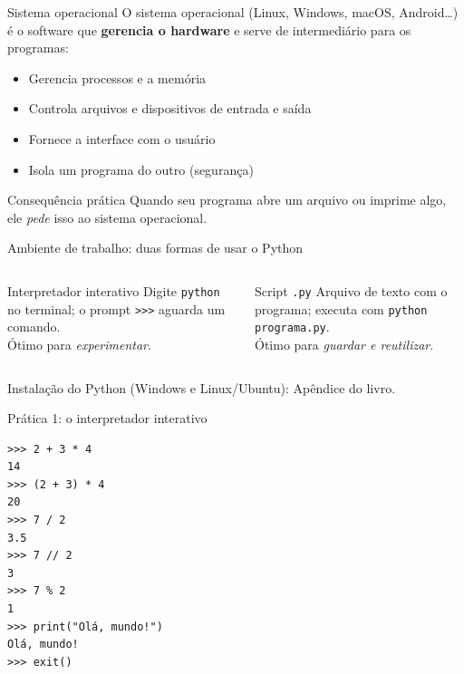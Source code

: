 \documentclass[aspectratio=169,10pt,t]{beamer}
\begin{document}
\begin{frame}{Sistema operacional}
  O sistema operacional (Linux, Windows, macOS, Android\ldots) é o software que \textbf{gerencia o hardware} e serve de intermediário para os programas:
  \begin{itemize}
    \item Gerencia processos e a memória
    \item Controla arquivos e dispositivos de entrada e saída
    \item Fornece a interface com o usuário
    \item Isola um programa do outro (segurança)
  \end{itemize}
  \begin{exampleblock}{Consequência prática}
    Quando seu programa abre um arquivo ou imprime algo, ele \emph{pede} isso ao sistema operacional.
  \end{exampleblock}
\end{frame}

\begin{frame}{Ambiente de trabalho: duas formas de usar o Python}
  \begin{columns}[T]
    \begin{block}{Interpretador interativo}
      Digite \texttt{python} no terminal; o prompt \texttt{>>>} aguarda um comando.\\
      Ótimo para \emph{experimentar}.
    \end{block}
    \begin{block}{Script \texttt{.py}}
      Arquivo de texto com o programa; executa com \texttt{python programa.py}.\\
      Ótimo para \emph{guardar e reutilizar}.
    \end{block}
  \end{columns}
  \vspace{1ex}
  \small Instalação do Python (Windows e Linux/Ubuntu): Apêndice do livro.
\end{frame}

\begin{frame}[fragile]{Prática 1: o interpretador interativo}
\begin{lstlisting}
>>> 2 + 3 * 4
14
>>> (2 + 3) * 4
20
>>> 7 / 2
3.5
>>> 7 // 2
3
>>> 7 % 2
1
>>> print("Olá, mundo!")
Olá, mundo!
>>> exit()
\end{lstlisting}
\end{frame}
\end{document}
